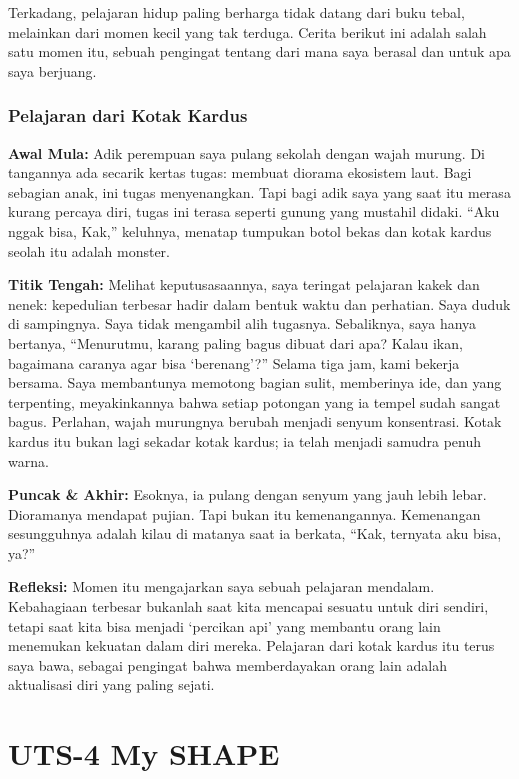\documentclass[
  letterpaper,
  DIV=11,
  numbers=noendperiod]{scrreprt}
\begin{document}
Terkadang, pelajaran hidup paling berharga tidak datang dari buku tebal,
melainkan dari momen kecil yang tak terduga. Cerita berikut ini adalah
salah satu momen itu, sebuah pengingat tentang dari mana saya berasal
dan untuk apa saya berjuang.

\subsection{Pelajaran dari Kotak
Kardus}\label{pelajaran-dari-kotak-kardus}

\textbf{Awal Mula:} Adik perempuan saya pulang sekolah dengan wajah
murung. Di tangannya ada secarik kertas tugas: membuat diorama ekosistem
laut. Bagi sebagian anak, ini tugas menyenangkan. Tapi bagi adik saya
yang saat itu merasa kurang percaya diri, tugas ini terasa seperti
gunung yang mustahil didaki. ``Aku nggak bisa, Kak,'' keluhnya, menatap
tumpukan botol bekas dan kotak kardus seolah itu adalah monster.

\textbf{Titik Tengah:} Melihat keputusasaannya, saya teringat pelajaran
kakek dan nenek: kepedulian terbesar hadir dalam bentuk waktu dan
perhatian. Saya duduk di sampingnya. Saya tidak mengambil alih tugasnya.
Sebaliknya, saya hanya bertanya, ``Menurutmu, karang paling bagus dibuat
dari apa? Kalau ikan, bagaimana caranya agar bisa `berenang'?'' Selama
tiga jam, kami bekerja bersama. Saya membantunya memotong bagian sulit,
memberinya ide, dan yang terpenting, meyakinkannya bahwa setiap potongan
yang ia tempel sudah sangat bagus. Perlahan, wajah murungnya berubah
menjadi senyum konsentrasi. Kotak kardus itu bukan lagi sekadar kotak
kardus; ia telah menjadi samudra penuh warna.

\textbf{Puncak \& Akhir:} Esoknya, ia pulang dengan senyum yang jauh
lebih lebar. Dioramanya mendapat pujian. Tapi bukan itu kemenangannya.
Kemenangan sesungguhnya adalah kilau di matanya saat ia berkata, ``Kak,
ternyata aku bisa, ya?''

\textbf{Refleksi:} Momen itu mengajarkan saya sebuah pelajaran mendalam.
Kebahagiaan terbesar bukanlah saat kita mencapai sesuatu untuk diri
sendiri, tetapi saat kita bisa menjadi `percikan api' yang membantu
orang lain menemukan kekuatan dalam diri mereka. Pelajaran dari kotak
kardus itu terus saya bawa, sebagai pengingat bahwa memberdayakan orang
lain adalah aktualisasi diri yang paling sejati.


\chapter{UTS-4 My SHAPE}\label{uts-4-my-shape}
\end{document}

